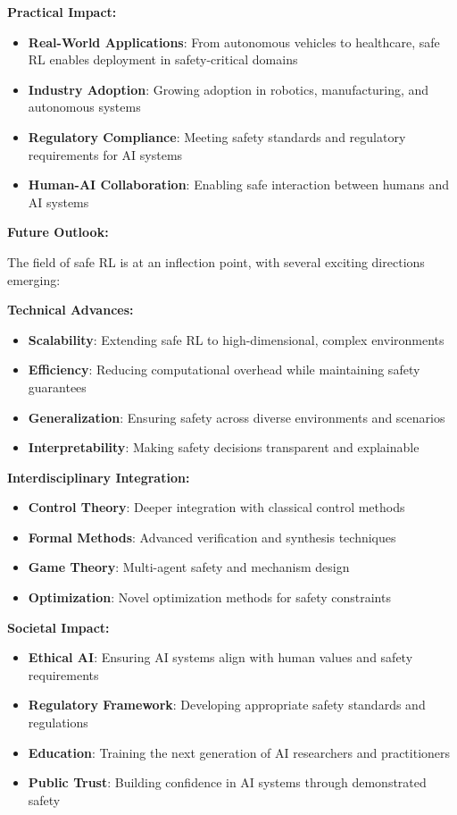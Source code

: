 \documentclass[12pt]{article}
\begin{document}
{{{{\textbf{Practical Impact:}
\begin{itemize}
\item \textbf{Real-World Applications}: From autonomous vehicles to healthcare, safe RL enables deployment in safety-critical domains
\item \textbf{Industry Adoption}: Growing adoption in robotics, manufacturing, and autonomous systems
\item \textbf{Regulatory Compliance}: Meeting safety standards and regulatory requirements for AI systems
\item \textbf{Human-AI Collaboration}: Enabling safe interaction between humans and AI systems
\end{itemize}

\textbf{Future Outlook:}

The field of safe RL is at an inflection point, with several exciting directions emerging:

\textbf{Technical Advances:}
\begin{itemize}
\item \textbf{Scalability}: Extending safe RL to high-dimensional, complex environments
\item \textbf{Efficiency}: Reducing computational overhead while maintaining safety guarantees
\item \textbf{Generalization}: Ensuring safety across diverse environments and scenarios
\item \textbf{Interpretability}: Making safety decisions transparent and explainable
\end{itemize}

\textbf{Interdisciplinary Integration:}
\begin{itemize}
\item \textbf{Control Theory}: Deeper integration with classical control methods
\item \textbf{Formal Methods}: Advanced verification and synthesis techniques
\item \textbf{Game Theory}: Multi-agent safety and mechanism design
\item \textbf{Optimization}: Novel optimization methods for safety constraints
\end{itemize}

\textbf{Societal Impact:}
\begin{itemize}
\item \textbf{Ethical AI}: Ensuring AI systems align with human values and safety requirements
\item \textbf{Regulatory Framework}: Developing appropriate safety standards and regulations
\item \textbf{Education}: Training the next generation of AI researchers and practitioners
\item \textbf{Public Trust}: Building confidence in AI systems through demonstrated safety
\end{itemize}

}}}}
\end{document}
